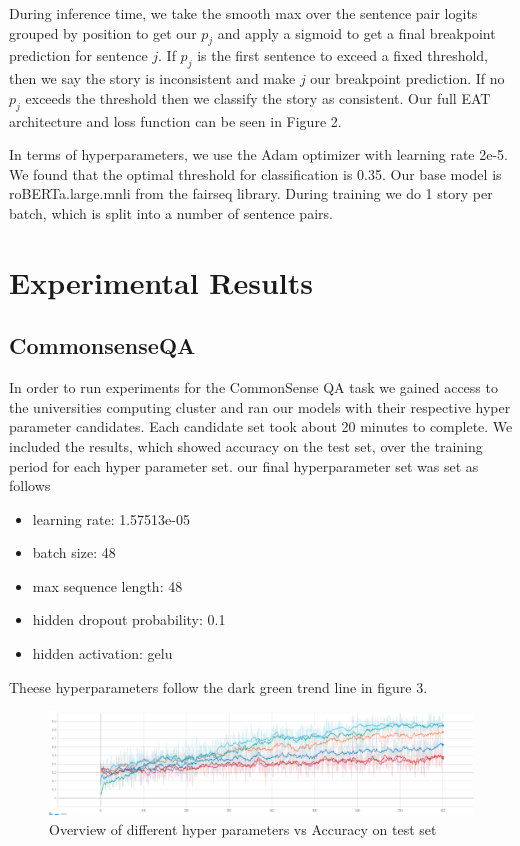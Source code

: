 \documentclass[11pt,a4paper]{article}
\begin{document}
During inference time, we take the smooth max over the sentence pair logits grouped by position to get our $p_j$ and apply a sigmoid to get a final breakpoint prediction for sentence $j$. If $p_j$ is the first sentence to exceed a fixed threshold, then we say the story is inconsistent and make $j$ our breakpoint prediction. If no $p_j$ exceeds the threshold then we classify the story as consistent. Our full EAT architecture and loss function can be seen in Figure 2.

In terms of hyperparameters, we use the Adam optimizer with learning rate 2e-5. We found that the optimal threshold for classification is 0.35. Our base model is roBERTa.large.mnli from the fairseq \citep{ott2019fairseq} library. During training we do 1 story per batch, which is split into a number of sentence pairs.

\section{Experimental Results}
\subsection{CommonsenseQA}


In order to run experiments for the CommonSense QA task we gained access to the universities computing cluster and ran our models with their respective hyper parameter candidates. Each candidate set took about 20 minutes to complete. We included the results, which showed accuracy on the test set, over the training period for each hyper parameter set. our final hyperparameter set was set as follows 

\begin{itemize}
    \item learning rate:  1.57513e-05
    \item batch size:  48
    \item max sequence length:  48
    \item hidden dropout probability:  0.1
    \item hidden activation: gelu
\end{itemize}

Theese hyperparameters follow the dark green trend line in figure 3.

\begin{figure}[t]
    \centering
    \includegraphics[width=\linewidth]{assets/QA_diagram.pdf}
    \caption{Overview of different hyper parameters  vs Accuracy on test set}
\end{figure}
\end{document}
